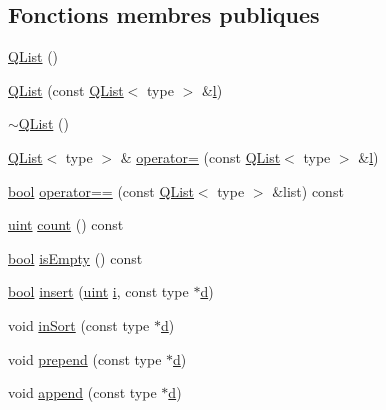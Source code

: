 \subsection*{Fonctions membres publiques}
\begin{DoxyCompactItemize}
\item 
\hyperlink{class_q_list_a9bb71276882b9a89646d3d5bb43e4433}{Q\+List} ()
\item 
\hyperlink{class_q_list_ae478762e2cd66b36343b224e145f5511}{Q\+List} (const \hyperlink{class_q_list}{Q\+List}$<$ type $>$ \&\hyperlink{060__command__switch_8tcl_aff56f84b49947b84b2a304f51cf8e678}{l})
\item 
\hyperlink{class_q_list_a1ec46a277cb7d89413a6f7f555480a28}{$\sim$\+Q\+List} ()
\item 
\hyperlink{class_q_list}{Q\+List}$<$ type $>$ \& \hyperlink{class_q_list_a89ee1ea9e1b3b67652eb2b261a2e645f}{operator=} (const \hyperlink{class_q_list}{Q\+List}$<$ type $>$ \&\hyperlink{060__command__switch_8tcl_aff56f84b49947b84b2a304f51cf8e678}{l})
\item 
\hyperlink{qglobal_8h_a1062901a7428fdd9c7f180f5e01ea056}{bool} \hyperlink{class_q_list_adb72895d95970a3eb2628d32dca40b26}{operator==} (const \hyperlink{class_q_list}{Q\+List}$<$ type $>$ \&list) const 
\item 
\hyperlink{qglobal_8h_a4d3943ddea65db7163a58e6c7e8df95a}{uint} \hyperlink{class_q_list_a0de89a0e2479de170257a323000a5883}{count} () const 
\item 
\hyperlink{qglobal_8h_a1062901a7428fdd9c7f180f5e01ea056}{bool} \hyperlink{class_q_list_a33e667557cd45f3cb62650b09a994f66}{is\+Empty} () const 
\item 
\hyperlink{qglobal_8h_a1062901a7428fdd9c7f180f5e01ea056}{bool} \hyperlink{class_q_list_af0672080349b6042d0b7821939c29e42}{insert} (\hyperlink{qglobal_8h_a4d3943ddea65db7163a58e6c7e8df95a}{uint} \hyperlink{060__command__switch_8tcl_a8c90afd4641b25be86bd09983c3cbee0}{i}, const type $\ast$\hyperlink{060__command__switch_8tcl_af43f4b1f0064a33b2d662af9f06d3a00}{d})
\item 
void \hyperlink{class_q_list_a4cd1b3c27f37804792938ed545d85350}{in\+Sort} (const type $\ast$\hyperlink{060__command__switch_8tcl_af43f4b1f0064a33b2d662af9f06d3a00}{d})
\item 
void \hyperlink{class_q_list_ad67924b4a5401aaa641e7d0b874c16c6}{prepend} (const type $\ast$\hyperlink{060__command__switch_8tcl_af43f4b1f0064a33b2d662af9f06d3a00}{d})
\item 
void \hyperlink{class_q_list_a135a23ed5f79ddc9b7d071545032f1a5}{append} (const type $\ast$\hyperlink{060__command__switch_8tcl_af43f4b1f0064a33b2d662af9f06d3a00}{d})

\end{DoxyCompactItemize}
